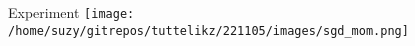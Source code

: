     \begin{frame}{Experiment}
      \centering
        \texttt{[image: /home/suzy/gitrepos/tuttelikz/221105/images/sgd\_mom.png]}
    \end{frame}

  \begin{frame}
    \printbibliography
  \end{frame} 




